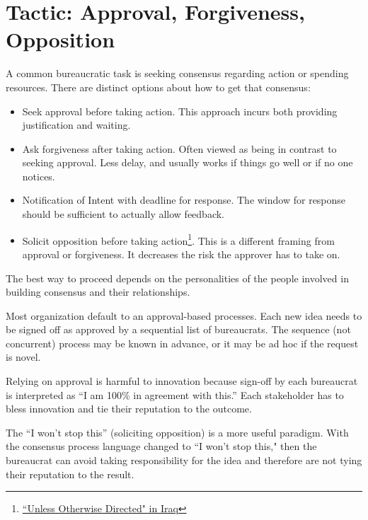 \section{Tactic: Approval, Forgiveness, Opposition\label{sec:approval-forgiveness-opposition}}

A common bureaucratic task is seeking consensus regarding action or spending resources. There are distinct options about how to get that consensus:
\begin{itemize}
    \item Seek approval before taking action. This approach incurs both providing justification and waiting.
    \item Ask forgiveness after taking action. Often viewed as being in contrast to seeking approval. Less delay, and usually works if things go well or if no one notices. 
    \item Notification of Intent with deadline for response. The window for response should be sufficient to actually allow feedback. 
    \item Solicit opposition before taking action\footnote{\href{https://www.dailykos.com/stories/2009/2/11/696188/-}{``Unless Otherwise Directed" in Iraq}}. This is a different framing from approval or forgiveness. It decreases the risk the approver has to take on.
\end{itemize}
The best way to proceed depends on the personalities of the people involved in building consensus and their relationships. 

Most organization default to an approval-based  processes. Each new idea needs to be signed off as approved by a sequential list of bureaucrats. The sequence (not concurrent) process may be known in advance, or it may be ad hoc if the request is novel.

Relying on approval is harmful to innovation because sign-off by each bureaucrat is interpreted as ``I am 100\% in agreement with this.'' Each stakeholder has to bless innovation and tie their reputation to the outcome.

The ``I won't stop this'' (soliciting opposition) is a more useful paradigm. With the consensus process language changed to ``I won't stop this," then the bureaucrat can avoid taking responsibility for the idea and therefore are not tying their reputation to the result.

